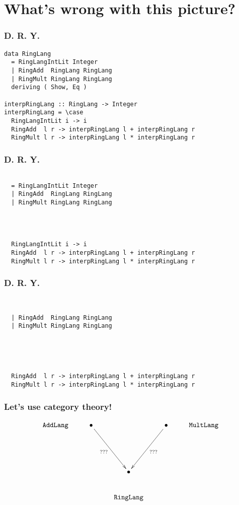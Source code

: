 \documentclass[pdf]{beamer}
\begin{document}
\section{What's wrong with this picture?}

\begin{frame}[fragile]
  \frametitle{D. R. Y.}
\begin{lstlisting}
data RingLang
  = RingLangIntLit Integer
  | RingAdd  RingLang RingLang
  | RingMult RingLang RingLang
  deriving ( Show, Eq )

interpRingLang :: RingLang -> Integer
interpRingLang = \case
  RingLangIntLit i -> i
  RingAdd  l r -> interpRingLang l + interpRingLang r
  RingMult l r -> interpRingLang l * interpRingLang r
\end{lstlisting}
\end{frame}

\begin{frame}[fragile]
  \frametitle{D. R. Y.}
\begin{lstlisting}

  = RingLangIntLit Integer
  | RingAdd  RingLang RingLang
  | RingMult RingLang RingLang




  RingLangIntLit i -> i
  RingAdd  l r -> interpRingLang l + interpRingLang r
  RingMult l r -> interpRingLang l * interpRingLang r
\end{lstlisting}
\end{frame}

\begin{frame}[fragile]
  \frametitle{D. R. Y.}
\begin{lstlisting}


  | RingAdd  RingLang RingLang
  | RingMult RingLang RingLang





  RingAdd  l r -> interpRingLang l + interpRingLang r
  RingMult l r -> interpRingLang l * interpRingLang r
\end{lstlisting}
\end{frame}


\begin{frame}
  \frametitle{Let's use category theory!}
  \begin{displaymath}
    \xymatrix{
      \mathtt{AddLang} & \bullet \ar[rdd]_{???} & & \ar[ldd]^{???} \bullet & \mathtt{MultLang} \\
      & & & & \\
      & & \bullet & & \\
      & & \mathtt{RingLang} & & \\
    }
  \end{displaymath}
\end{frame}
\end{document}
